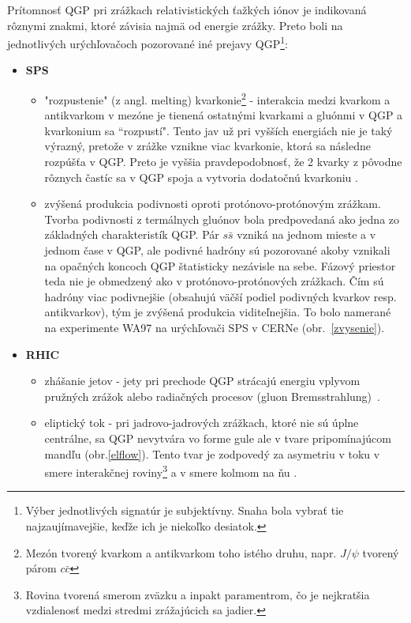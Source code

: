 \documentclass[thesismargins, thesislinespacing]{rnthesis}
\begin{document}
Prítomnosť QGP pri zrážkach relativistických ťažkých iónov je indikovaná rôznymi znakmi, ktoré závisia najmä od energie zrážky. Preto boli na jednotlivých urýchľovačoch pozorované iné prejavy QGP\footnote{Výber jednotlivých signatúr je subjektívny. Snaha bola vybrať tie najzaujímavejšie, keďže ich je niekoľko desiatok.}:
\begin{itemize}
	\item \textbf{SPS}
	\begin{itemize}
		\item "rozpustenie" (z angl. melting) kvarkonie\footnote{Mezón tvorený kvarkom a antikvarkom toho istého druhu, napr. $J/ \psi$ tvorený párom $c \bar{c}$ } - interakcia medzi kvarkom a antikvarkom v mezóne je tienená ostatnými kvarkami a gluónmi v QGP a kvarkonium sa “rozpustí". Tento jav už pri vyšších energiách nie je taký výrazný, pretože v zrážke vznikne viac kvarkonie, ktorá sa následne rozpúšťa v QGP. Preto je vyššia pravdepodobnosť, že 2 kvarky z pôvodne rôznych častíc sa v QGP spoja a vytvoria dodatočnú kvarkoniu \cite{JpsiSupp}.
		\item zvýšená produkcia podivnosti oproti protónovo-protónovým zrážkam. Tvorba podivnosti z termálnych gluónov bola predpovedaná ako jedna zo \-zák\-lad\-ných charakteristík QGP. Pár $s \bar{s}$ vzniká na jednom mieste a v jednom čase v QGP, ale podivné hadróny sú pozorované akoby vznikali na opačných koncoch QGP štatisticky nezávisle na sebe. Fázový priestor  teda nie je obmedzený ako v protónovo-protónových zrážkach.
		Čím sú hadróny viac podivnejšie (obsahujú väčší podiel podivných kvarkov resp. antikvarkov), tým je zvýšená produkcia viditeľnejšia. To bolo namerané na experimente WA97 na urýchľovači SPS v CERNe \cite{zvysenie} (obr.~\ref{zvysenie}).
	\end{itemize}
	\item \textbf{RHIC}
	\begin{itemize}
		\item zhášanie jetov - jety pri prechode QGP strácajú energiu vplyvom pružných zrážok alebo radiačných procesov (gluon Bremsstrahlung)~\cite{rhic}.
		\item eliptický tok - pri jadrovo-jadrových zrážkach, ktoré nie sú úplne centrálne, sa QGP nevytvára vo forme gule ale v tvare pripomínajúcom mandľu (obr.\ref{elflow}). Tento tvar je zodpovedý za asymetriu v toku v smere interakčnej roviny\footnote{Rovina tvorená smerom zväzku a inpakt paramentrom, čo je nejkratšia vzdialenosť medzi stredmi zrážajúcich sa jadier.} a v smere kolmom na ňu \cite{elflow}. 
	\end{itemize}

\end{itemize}
\end{document}

